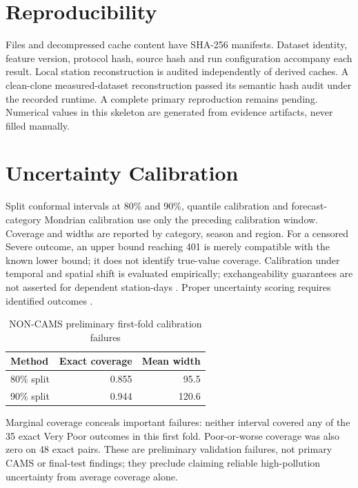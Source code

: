 \documentclass[journal]{IEEEtran}
\begin{document}
\section{Reproducibility}
Files and decompressed cache content have SHA-256 manifests. Dataset identity,
feature version, protocol hash, source hash and run configuration accompany each
result. Local station reconstruction is audited independently of derived caches.
A clean-clone measured-dataset reconstruction passed its semantic hash audit under the recorded runtime. A complete primary reproduction remains pending. Numerical values
in this skeleton are generated from evidence artifacts, never filled manually.
\clearpage
\section{Uncertainty Calibration}
Split conformal intervals at 80\% and 90\%, quantile calibration and
forecast-category Mondrian calibration use only the preceding calibration
window. Coverage and widths are reported by category, season and region.
For a censored Severe outcome, an upper bound reaching 401 is merely compatible
with the known lower bound; it does not identify true-value coverage.
Calibration under temporal and spatial shift is evaluated empirically;
exchangeability guarantees are not asserted for dependent station-days
\cite{gibbs2021aci,xu2021enbpi}. Proper uncertainty scoring requires identified
outcomes \cite{gneiting2007scoring}.





\begin{table}[h]\centering\caption{NON-CAMS preliminary first-fold calibration failures}
\begin{tabular}{lrr}\toprule Method & Exact coverage & Mean width\\\midrule
80\% split & 0.855 & 95.5\\
90\% split & 0.944 & 120.6\\
\bottomrule\end{tabular}
\end{table}
Marginal coverage conceals important failures: neither interval covered any
of the 35 exact Very Poor outcomes in this first fold. Poor-or-worse coverage
was also zero on 48 exact pairs. These are preliminary validation failures,
not primary CAMS or final-test findings; they preclude claiming reliable
high-pollution uncertainty from average coverage alone.
\end{document}
